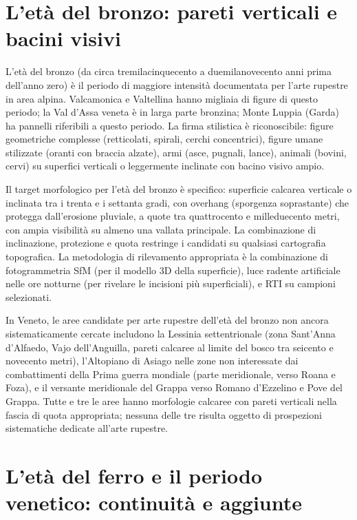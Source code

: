 \section{L'età del bronzo: pareti verticali e bacini visivi}

L'età del bronzo (da circa tremilacinquecento a duemilanovecento anni prima dell'anno zero) è il periodo di maggiore intensità documentata per l'arte rupestre in area alpina. Valcamonica e Valtellina hanno migliaia di figure di questo periodo; la Val d'Assa veneta è in larga parte bronzina; Monte Luppia (Garda) ha pannelli riferibili a questo periodo. La firma stilistica è riconoscibile: figure geometriche complesse (retticolati, spirali, cerchi concentrici), figure umane stilizzate (oranti con braccia alzate), armi (asce, pugnali, lance), animali (bovini, cervi) su superfici verticali o leggermente inclinate con bacino visivo ampio.

Il target morfologico per l'età del bronzo è specifico: superficie calcarea verticale o inclinata tra i trenta e i settanta gradi, con overhang (sporgenza soprastante) che protegga dall'erosione pluviale, a quote tra quattrocento e milleduecento metri, con ampia visibilità su almeno una vallata principale. La combinazione di inclinazione, protezione e quota restringe i candidati su qualsiasi cartografia topografica. La metodologia di rilevamento appropriata è la combinazione di fotogrammetria SfM (per il modello 3D della superficie), luce radente artificiale nelle ore notturne (per rivelare le incisioni più superficiali), e RTI su campioni selezionati.

In Veneto, le aree candidate per arte rupestre dell'età del bronzo non ancora sistematicamente cercate includono la Lessinia settentrionale (zona Sant'Anna d'Alfaedo, Vajo dell'Anguilla, pareti calcaree al limite del bosco tra seicento e novecento metri), l'Altopiano di Asiago nelle zone non interessate dai combattimenti della Prima guerra mondiale (parte meridionale, verso Roana e Foza), e il versante meridionale del Grappa verso Romano d'Ezzelino e Pove del Grappa. Tutte e tre le aree hanno morfologie calcaree con pareti verticali nella fascia di quota appropriata; nessuna delle tre risulta oggetto di prospezioni sistematiche dedicate all'arte rupestre.

\section{L'età del ferro e il periodo venetico: continuità e aggiunte}

